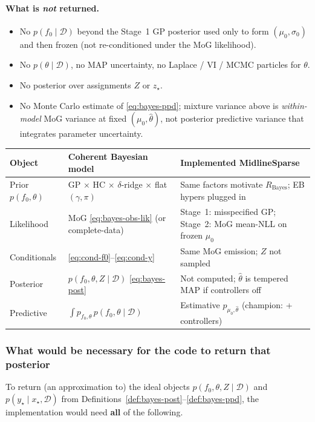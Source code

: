 \documentclass[11pt,a4paper]{article}
\theoremstyle{plain}
\theoremstyle{definition}
\theoremstyle{remark}
\newcommand{\D}{\mathcal{D}}
\newcommand{\tht}{\theta}
\begin{document}
\paragraph{What is \emph{not} returned.}
\begin{itemize}[leftmargin=1.2em]
  \item No \(p(f_0\mid\D)\) beyond the Stage~1 GP posterior used only to form
        \((\mu_0,\sigma_0)\) and then frozen (not re-conditioned under the MoG
        likelihood).
  \item No \(p(\tht\mid\D)\), no MAP uncertainty, no Laplace / VI / MCMC particles
        for \(\tht\).
  \item No posterior over assignments \(Z\) or \(z_\star\).
  \item No Monte Carlo estimate of \eqref{eq:bayes-ppd}; mixture variance above is
        \emph{within-model} MoG variance at fixed \((\mu_0,\hat\tht)\), not posterior
        predictive variance that integrates parameter uncertainty.
\end{itemize}

\begin{center}
\renewcommand{\arraystretch}{1.15}
\begin{tabular}{@{}p{3.1cm}p{5.5cm}p{5.5cm}@{}}
\toprule
Object & Coherent Bayesian model & Implemented MidlineSparse \\
\midrule
Prior \(p(f_0,\tht)\) &
  GP \(\times\) HC \(\times\) \(\delta\)-ridge \(\times\) flat \((\gamma,\pi)\) &
  Same factors motivate \(R_{\mathrm{Bayes}}\); EB hypers plugged in \\
Likelihood &
  MoG \eqref{eq:bayes-obs-lik} (or complete-data) &
  Stage~1: misspecified GP; Stage~2: MoG mean-NLL on frozen \(\mu_0\) \\
Conditionals &
  \eqref{eq:cond-f0}--\eqref{eq:cond-y} &
  Same MoG emission; \(Z\) not sampled \\
Posterior &
  \(p(f_0,\tht,Z\mid\D)\) \eqref{eq:bayes-post} &
  Not computed; \(\hat\tht\) is tempered MAP if controllers off \\
Predictive &
  \(\int p_{f_0,\tht}\,p(f_0,\tht\mid\D)\) &
  Estimative \(p_{\mu_0,\hat\tht}\) (champion: + controllers) \\
\bottomrule
\end{tabular}
\end{center}

\subsubsection{What would be necessary for the code to return that posterior}
\label{sec:code-to-posterior}
To return (an approximation to) the ideal objects
\(p(f_0,\tht,Z\mid\D)\) and \(p(y_\star\mid x_\star,\D)\) from
Definitions~\ref{def:bayes-post}--\ref{def:bayes-ppd}, the implementation would need
\textbf{all} of the following.
\end{document}
